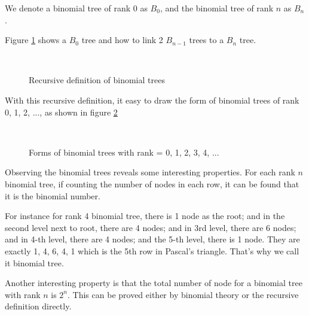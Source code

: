 \documentclass{article}
\begin{document}
We denote a binomial tree of rank 0 as $B_0$, and the binomial tree of rank
$n$ as $B_n$.

Figure \ref{fig:link-bitree} shows a $B_0$ tree and how to link 2 $B_{n-1}$
trees to a $B_n$ tree.

\begin{figure}[htbp]
  \centering
   \\
  \caption{Recursive definition of binomial trees} \label{fig:link-bitree}
\end{figure}

With this recursive definition, it easy to draw the form of binomial trees
of rank 0, 1, 2, ..., as shown in figure \ref{fig:bitree-forms}

\begin{figure}[htbp]
  \centering
   \\
  \caption{Forms of binomial trees with rank = 0, 1, 2, 3, 4, ...} \label{fig:bitree-forms}
\end{figure}

Observing the binomial trees reveals some interesting properties. For each rank $n$ binomial tree, if counting the number of nodes in each row, it can be found that it is the binomial number.

For instance for rank 4 binomial tree, there is 1 node as the root; and in the second level next to root, there are 4 nodes; and in 3rd level, there are 6 nodes; and in 4-th level, there are 4 nodes; and the 5-th level, there is 1 node. They are exactly 1, 4, 6, 4, 1 which is the 5th row in Pascal's triangle. That's why we call it binomial tree.

Another interesting property is that the total number of node for a binomial tree with rank $n$ is $2^n$. This can be proved either by binomial theory or the recursive definition directly.
\end{document}
